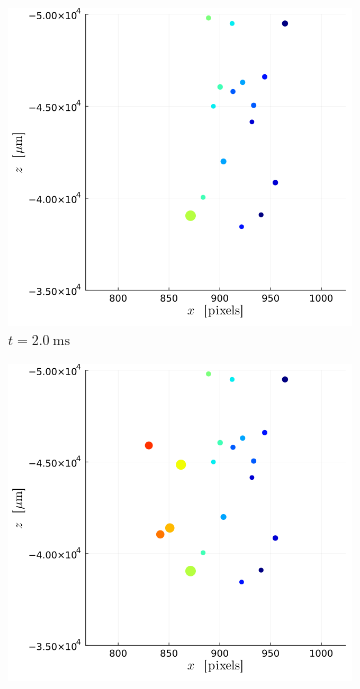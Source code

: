 \begin{figure}[H]
    \addtocounter{figure}{-1}
    \centering
    \begin{subfigure}[t]{0.32\linewidth}
        \includegraphics[width=\linewidth]{./Figure/4_Results/exp/xz_detailed_view/out0009.png}
        \caption*{$t = \SI{2.0}{\ms}$}
    \end{subfigure}
    \begin{subfigure}[t]{0.32\linewidth}
        \includegraphics[width=\linewidth]{./Figure/4_Results/exp/xz_detailed_view/out0013.png}

\end{subfigure}
\end{figure}
